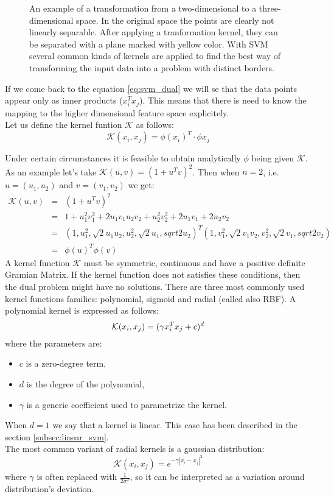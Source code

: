 \begin{figure}[htbp]
  \centering
  
  \caption{An example of a transformation from a two-dimensional to a three-dimensional space. In the original space the points are clearly not linearly separable. After applying a tranformation kernel, they can be separated with a plane marked with yellow color. With SVM several common kinds of kernels are applied to find the best way of transforming the input data into a problem with distinct borders. }
  \label{fig:2dto3d}
\end{figure}

If we come back to the equation \ref{eq:svm_dual} we will se that the data points appear only as inner products ($x_i^Tx_j$). This means that there is need to know the mapping to the higher dimensional feature space explicitely. \\
Let us define the kernel funtion $\mathcal{K}$ as follows:
\begin{equation}
\mathcal{K}(x_i, x_j) = \phi(x_i)^T \cdot \phi{x_j}
\end{equation}

Under certain circumstances it is feasible to obtain analytically $\phi$ being given $\mathcal{K}$. As an example let's take $\mathcal{K}(u, v) = (1+u^Tv)^2$. Then when $n=2$, i.e. $u=(u_1,u_2)$ and $v=(v_1, v_2)$ we get:
\begin{align*}
\mathcal{K}(u, v) & = & (1+u^Tv)^2 \\
& = & 1 + u_1^2v_1^2+2u_1v_1u_2v_2+u_2^2v_2^2+2u_1v_1+2u_2v_2 \\
& = & (1, u_1^2, \sqrt{2}u_1u_2, u_2^2, \sqrt{2}u_1, sqrt{2}u_2)^T(1, v_1^2, \sqrt{2}v_1v_2, v_2^2, \sqrt{2}v_1, sqrt{2}v_2) \\
& = & \phi(u)^T\phi(v)
\end{align*}
A kernel function $\mathcal{K}$ must be symmetric, continuous and have a positive definite Gramian Matrix. If the kernel function does not satisfies these conditions, then the dual problem might have no solutions.
There are three most commonly used kernel functions families: polynomial, sigmoid and radial (called also RBF).
A polynomial kernel is expressed as follows:
\begin{equation}
\mathcal{K}(x_i, x_j) = (\gamma x_i^Tx_j + c)^d \\
\end{equation}
where the parameters are:
\begin{itemize}
\item $c$ is a zero-degree term,
\item $d$ is the degree of the polynomial,
\item $\gamma$ is a generic coefficient used to parametrize the kernel.
\end{itemize}
When $d=1$ we say that a kernel is linear. This case has been described in the section \ref{subsec:linear_svm}.
\\
The most common variant of radial kernels is a gaussian distribution:
\begin{equation}
\mathcal{K}(x_i, x_j) = e^{-\gamma|x_i-x_j|^2}
\end{equation}
where $\gamma$ is often replaced with $\frac{1}{2\sigma^2}$, so it can be interpreted as a variation around distribution's deviation.
